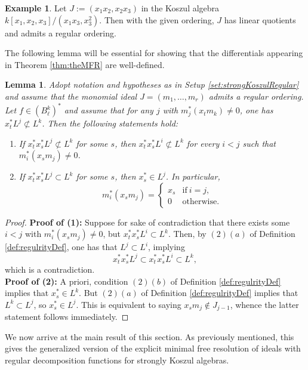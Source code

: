 \documentclass[10pt]{amsart}
\newtheorem{lemma}[theorem]{Lemma}
\theoremstyle{definition}
\newtheorem{example}[theorem]{Example}
\theoremstyle{remark}
\newtheorem{the context}[theorem]{The Context}
\numberwithin{equation}{theorem}
\numberwithin{equation}{section}
\begin{document}
\begin{example}
Let $J := (x_1 x_2 , x_2 x_3)$ in the Koszul algebra $k[x_1,x_2,x_3] /(x_1x_3, x_3^2)$. Then with the given ordering, $J$ has linear quotients and admits a regular ordering.
\end{example}

The following lemma will be essential for showing that the differentials appearing in Theorem \ref{thm:theMFR} are well-defined.

\begin{lemma}\label{lem:wellDefComp}
Adopt notation and hypotheses as in Setup \ref{set:strongKoszulRegular} and assume that the monomial ideal $J = (m_1 , \dots , m_r)$ admits a regular ordering. Let $f \in (B_\ell^k)^*$ and assume that for any $j$ with $m_j^* (x_t m_k) \neq 0$, one has $x_t^* L^j \not\subset L^k$. Then the following statements hold:
\begin{enumerate}
    \item If $x_t^* x_s^* L^j \not\subset L^k$ for some $s$, then $x_t^* x_s^* L^i \not\subset L^k$ for every $i < j$ such that $m_i^* (x_s m_j) \neq 0$.
    \item If $x_t^* x_s^* L^j \subset L^k$ for some $s$, then $x_s^* \in L^j$. In particular, 
    $$m_i^* (x_s m_j) = \begin{cases} 
x_s & \textrm{if} \ i=j, \\
0 & \textrm{otherwise}.
\end{cases}$$
\end{enumerate}
\end{lemma}

\begin{proof}
\textbf{Proof of (1):} Suppose for sake of contradiction that there exists some $i<j$ with $m_i^* (x_s m_j) \neq 0$, but $x_t^* x_s^* L^i \subset L^k$. Then, by $(2)(a)$ of Definition \ref{def:regulrityDef}, one has that $L^j \subset  L^i$, implying
$$x_t^* x_s^* L^j \subset x_t^* x_s^* L^i \subset L^k,$$
which is a contradiction. \\
\textbf{Proof of (2):} A priori, condition $(2)(b)$ of Definition \ref{def:regulrityDef} implies that $x_s^* \in L^k$. But $(2)(a)$ of Definition \ref{def:regulrityDef} implies that $L^k \subset L^j$, so $x_s^* \in L^j$. This is equivalent to saying $x_s m_j \notin J_{j-1}$, whence the latter statement follows immediately. 
\end{proof}

We now arrive at the main result of this section. As previously mentioned, this gives the generalized version of the explicit minimal free resolution of ideals with regular decomposition functions for strongly Koszul algebras. 
\end{document}
